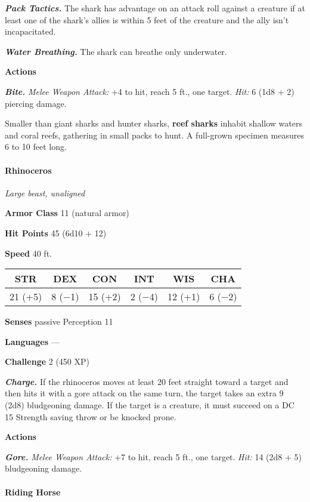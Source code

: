 \documentclass[
]{article}
\begin{document}
\emph{\textbf{Pack Tactics.}} The shark has advantage on an attack roll
against a creature if at least one of the shark's allies is within 5
feet of the creature and the ally isn't incapacitated.

\emph{\textbf{Water Breathing.}} The shark can breathe only underwater.

\textbf{Actions}

\emph{\textbf{Bite.}} \emph{Melee Weapon Attack:} +4 to hit, reach 5
ft., one target. \emph{Hit:} 6 (1d8 + 2) piercing damage.

Smaller than giant sharks and hunter sharks, \textbf{reef sharks}
inhabit shallow waters and coral reefs, gathering in small packs to
hunt. A full-grown specimen measures 6 to 10 feet long.

\hypertarget{rhinoceros}{%
\paragraph{Rhinoceros}\label{rhinoceros}}

\emph{Large beast, unaligned}

\textbf{Armor Class} 11 (natural armor)

\textbf{Hit Points} 45 (6d10 + 12)

\textbf{Speed} 40 ft.

\begin{longtable}[]{@{}cccccc@{}}
\toprule
STR & DEX & CON & INT & WIS & CHA\tabularnewline
\midrule
\endhead
21 (+5) & 8 (−1) & 15 (+2) & 2 (−4) & 12 (+1) & 6 (−2)\tabularnewline
\bottomrule
\end{longtable}

\textbf{Senses} passive Perception 11

\textbf{Languages} ---

\textbf{Challenge} 2 (450 XP)

\emph{\textbf{Charge.}} If the rhinoceros moves at least 20 feet
straight toward a target and then hits it with a gore attack on the same
turn, the target takes an extra 9 (2d8) bludgeoning damage. If the
target is a creature, it must succeed on a DC 15 Strength saving throw
or be knocked prone.

\textbf{Actions}

\emph{\textbf{Gore.}} \emph{Melee Weapon Attack:} +7 to hit, reach 5
ft., one target. \emph{Hit:} 14 (2d8 + 5) bludgeoning damage.

\hypertarget{riding-horse}{%
\paragraph{Riding Horse}\label{riding-horse}}
\end{document}
